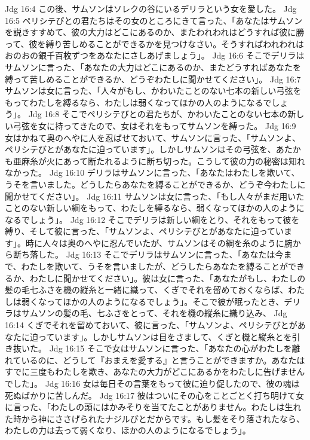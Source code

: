Jdg 16:4  この後、サムソンはソレクの谷にいるデリラという女を愛した。
Jdg 16:5  ペリシテびとの君たちはその女のところにきて言った、「あなたはサムソンを説きすすめて、彼の大力はどこにあるのか、またわれわれはどうすれば彼に勝って、彼を縛り苦しめることができるかを見つけなさい。そうすればわれわれはおのおの銀千百枚ずつをあなたにさしあげましょう」。
Jdg 16:6  そこでデリラはサムソンに言った、「あなたの大力はどこにあるのか、またどうすればあなたを縛って苦しめることができるか、どうぞわたしに聞かせてください」。
Jdg 16:7  サムソンは女に言った、「人々がもし、かわいたことのない七本の新しい弓弦をもってわたしを縛るなら、わたしは弱くなってほかの人のようになるでしょう」。
Jdg 16:8  そこでペリシテびとの君たちが、かわいたことのない七本の新しい弓弦を女に持ってきたので、女はそれをもってサムソンを縛った。
Jdg 16:9  女はかねて奥のへやに人を忍ばせておいて、サムソンに言った、「サムソンよ、ペリシテびとがあなたに迫っています」。しかしサムソンはその弓弦を、あたかも亜麻糸が火にあって断たれるように断ち切った。こうして彼の力の秘密は知れなかった。
Jdg 16:10  デリラはサムソンに言った、「あなたはわたしを欺いて、うそを言いました。どうしたらあなたを縛ることができるか、どうぞ今わたしに聞かせてください」。
Jdg 16:11  サムソンは女に言った、「もし人々がまだ用いたことのない新しい綱をもって、わたしを縛るなら、弱くなってほかの人のようになるでしょう」。
Jdg 16:12  そこでデリラは新しい綱をとり、それをもって彼を縛り、そして彼に言った、「サムソンよ、ペリシテびとがあなたに迫っています」。時に人々は奥のへやに忍んでいたが、サムソンはその綱を糸のように腕から断ち落した。
Jdg 16:13  そこでデリラはサムソンに言った、「あなたは今まで、わたしを欺いて、うそを言いましたが、どうしたらあなたを縛ることができるか、わたしに聞かせてください」。彼は女に言った、「あなたがもし、わたしの髪の毛七ふさを機の縦糸と一緒に織って、くぎでそれを留めておくならば、わたしは弱くなってほかの人のようになるでしょう」。そこで彼が眠ったとき、デリラはサムソンの髪の毛、七ふさをとって、それを機の縦糸に織り込み、
Jdg 16:14  くぎでそれを留めておいて、彼に言った、「サムソンよ、ペリシテびとがあなたに迫っています」。しかしサムソンは目をさまして、くぎと機と縦糸とを引き抜いた。
Jdg 16:15  そこで女はサムソンに言った、「あなたの心がわたしを離れているのに、どうして『おまえを愛する』と言うことができますか。あなたはすでに三度もわたしを欺き、あなたの大力がどこにあるかをわたしに告げませんでした」。
Jdg 16:16  女は毎日その言葉をもって彼に迫り促したので、彼の魂は死ぬばかりに苦しんだ。
Jdg 16:17  彼はついにその心をことごとく打ち明けて女に言った、「わたしの頭にはかみそりを当てたことがありません。わたしは生れた時から神にささげられたナジルびとだからです。もし髪をそり落されたなら、わたしの力は去って弱くなり、ほかの人のようになるでしょう」。
